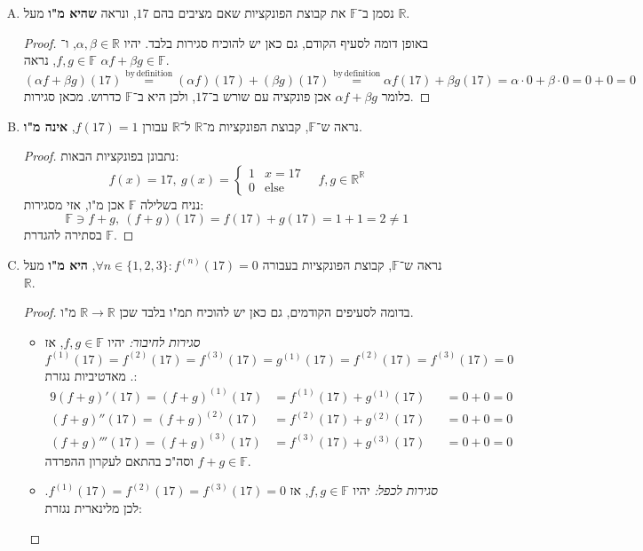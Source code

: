 \documentclass[]{article}
\newcommand\R     {\mathbb{R}}
\newcommand\other {\mathrm{else}}
\newcommand\F         {\mathbb{F}}
\newcommand\co        {\colon}
\newcommand\ag        {\alpha}
\newcommand\bg        {\beta}
\theoremstyle{definition}
\begin{document}
\begin{enumerate}[(A)]
\begin{proof}
			לכן הפונקציות החסומות במ"ו הפונקציות הממשיות הוא תמ"ו של $\R \to \R$ ובפרט מ"ו. 
		\end{proof}
		\item נסמן ב־$\F$ את קבוצת הפונקציות שאם מציבים בהם $17$, ונראה \textbf{שהיא מ"ו} מעל $\R$. \begin{proof}
			באופן דומה לסעיף הקודם, גם כאן יש להוכיח סגירות בלבד. יהיו $\ag, \bg \in \R$, ו־$f, g \in \F$, נראה $\ag f + \bg g \in \F$. 
			\[ (\ag f + \bg g)(17) \overset{\mathrm{by \, definition}}{=} (\ag f)(17) + (\bg g)(17) \overset{\mathrm{by \, definition}}{=} \ag f(17) + \bg g(17) = \ag \cdot 0 + \bg \cdot 0 = 0 + 0 = 0 \]
			כלומר $\ag f + \bg g$ אכן פונקציה עם שורש ב־$17$, ולכן היא ב־$\F$ כדרוש. מכאן סגירות. 
		\end{proof}
		\item נראה ש־$\F$, קבוצת הפונקציות מ־$\R$ ל־$\R$ עבורן $f(17) = 1$, \textbf{אינה מ"ו}. \begin{proof}
			נתבונן בפונקציות הבאות: 
			\[ f(x) = 17, \ g(x) = \begin{cases}
				1 & x = 17 \\
				0 & \other
			\end{cases} \quad f, g \in \R^{\R} \]
			נניח בשלילה $\F$ אכן מ"ו, אזי מסגירות: 
			\[ \F \ni f + g, \ (f + g)(17) = f(17) + g(17) = 1 + 1 = 2 \neq 1 \]
			בסתירה להגדרת $\F$. 
		\end{proof}
		\item נראה ש־$\F$, קבוצת הפונקציות בעבורה $\forall n \in \{1, 2, 3\}\co f^{(n)}(17) = 0$, \textbf{היא מ"ו} מעל $\R$. \begin{proof}
			בדומה לסעיפים הקודמים, גם כאן יש להוכיח תמ"ו בלבד שכן $\R \to \R$ מ"ו. 
			\begin{itemize}
				\item \textit{סגירות לחיבור: }יהיו $f, g \in \F$, אז $f^{(1)}(17) = f^{(2)}(17) = f^{(3)}(17) = g^{(1)}(17) = f^{(2)}(17) = f^{(3)}(17) = 0$. מאדטיביות נגזרת: 
				\begin{alignat*}{9}
					(f + g)'(17) = (f + g)^{(1)}(17) &= f^{(1)}(17) + g^{(1)}(17) &&= 0 + 0 = 0 \\
					(f + g)''(17) = (f + g)^{(2)}(17) &= f^{(2)}(17) + g^{(2)}(17) &&= 0 + 0 = 0 \\
					(f + g)'''(17) = (f + g)^{(3)}(17) &= f^{(3)}(17) + g^{(3)}(17) &&= 0 + 0 = 0
				\end{alignat*}
				וסה"כ בהתאם לעקרון ההפרדה $f + g \in \F$. 
				\item \textit{סגירות לכפל: }יהיו $f, g \in \F$, אז $f^{(1)}(17) = f^{(2)}(17) = f^{(3)}(17) = 0$. לכן מלינארית נגזרת: 

\end{itemize}
\end{proof}
\end{enumerate}
\end{document}
